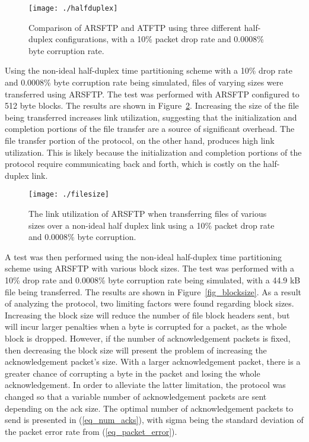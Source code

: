\documentclass[journal]{./IEEEtran}
\begin{document}
\begin{figure}[h!]
\begin{center}
\texttt{[image: ./halfduplex]}
\end{center}
\caption{Comparison of ARSFTP and ATFTP using three different half-duplex configurations, with a 10\% packet drop rate and 0.0008\% byte corruption rate.}
\label{fig_halfduplex}
\end{figure}

Using the non-ideal half-duplex time partitioning scheme with a 10\% drop rate and 0.0008\% byte corruption rate being simulated, files of varying sizes were transferred using ARSFTP.  The test was performed with ARSFTP configured to 512 byte blocks.  The results are shown in Figure~\ref{fig_filesize}.  Increasing the size of the file being transferred increases link utilization, suggesting that the initialization and completion portions of the file transfer are a source of significant overhead.  The file transfer portion of the protocol, on the other hand, produces high link utilization.  This is likely because the initialization and completion portions of the protocol require communicating back and forth, which is costly on the half-duplex link.

\begin{figure}[h!]
\begin{center}
\texttt{[image: ./filesize]}
\end{center}
\caption{The link utilization of ARSFTP when transferring files of various sizes over a non-ideal half duplex link using a 10\% packet drop rate and 0.0008\% byte corruption.}
\label{fig_filesize}
\end{figure}

A test was then performed using the non-ideal half-duplex time partitioning scheme using ARSFTP with various block sizes.  The test was performed with a 10\% drop rate and 0.0008\% byte corruption rate being simulated, with a 44.9 kB file being transferred.  The results are shown in Figure~\ref{fig_blocksize}.  As a result of analyzing the protocol, two limiting factors were found regarding block sizes.  Increasing the block size will reduce the number of file block headers sent, but will incur larger penalties when a byte is corrupted for a packet, as the whole block is dropped.  However, if the number of acknowledgement packets is fixed, then decreasing the block size will present the problem of increasing the acknowledgement packet’s size.  With a larger acknowledgement packet, there is a greater chance of corrupting a byte in the packet and losing the whole acknowledgement.  In order to alleviate the latter limitation, the protocol was changed so that a variable number of acknowledgement packets are sent depending on the ack size.  The optimal number of acknowledgement packets to send is presented in (\ref{eq_num_acks}), with sigma being the standard deviation of the packet error rate from (\ref{eq_packet_error}).
\end{document}

